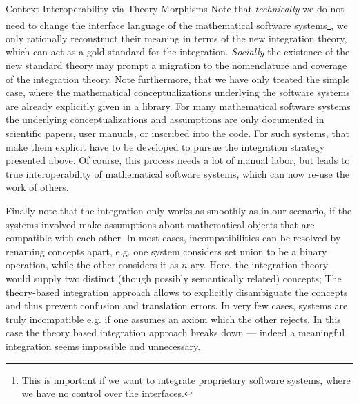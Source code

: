 \begin{tsubsection}[id=integrating-libraries]{Context Interoperability via Theory
    Morphisms}
Note that {\emph{technically}} we do not need to change the interface language of the
mathematical software systems\footnote{This is important if we want to integrate
  proprietary software systems, where we have no control over the interfaces.}, we only
rationally reconstruct their meaning in terms of the new integration theory, which can act
as a gold standard for the integration. {\emph{Socially}} the existence of the new
standard theory may prompt a migration to the nomenclature and coverage of the integration
theory. Note furthermore, that we have only treated the simple case, where the
mathematical conceptualizations underlying the software systems are already explicitly
given in a library. For many mathematical software systems the underlying
conceptualizations and assumptions are only documented in scientific papers, user manuals,
or inscribed into the code. For such systems, {} that make them explicit have to be developed to
pursue the integration strategy presented above. Of course, this process needs a lot of
manual labor, but leads to true interoperability of mathematical software systems, which
can now re-use the work of others.

Finally note that the integration only works as smoothly as in our scenario, if the
systems involved make assumptions about mathematical objects that are compatible with each
other. In most cases, incompatibilities can be resolved by renaming concepts apart,
e.g. one system considers set union to be a binary operation, while the other considers it
as $n$-ary. Here, the integration theory would supply two distinct (though possibly
semantically related) concepts; The theory-based integration approach allows to explicitly
disambiguate the concepts and thus prevent confusion and translation errors. In very few
cases, systems are truly incompatible e.g. if one assumes an axiom which the other
rejects. In this case the theory based integration approach breaks down --- indeed a
meaningful integration seems impossible and unnecessary.
\end{tsubsection}

